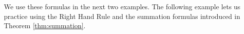 We use these formulas in the next two examples.
%
%
%
%
%
The following example lets us practice using the Right Hand Rule and the summation formulas introduced in Theorem \ref{thm:summation}.\\

